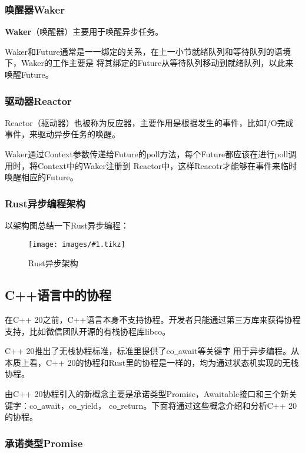 \documentclass[supercite]{HustGraduPaper}
\newcommand{\cfig}[3]{
  \begin{figure}[htb]
    \centering
    \texttt{[image: images/\#1.tikz]}
    \caption{#3}
    \label{fig:#1}
  \end{figure}
}
\theoremstyle{definition}
\begin{document}
\subsubsection{唤醒器Waker}
\textbf{Waker}（唤醒器）主要用于唤醒异步任务。\par

Waker和Future通常是一一绑定的关系，在上一小节就绪队列和等待队列的语境下，Waker的工作主要是
将其绑定的Future从等待队列移动到就绪队列，以此来唤醒Future。\par

\subsubsection{驱动器Reactor}
Reactor（驱动器）也被称为反应器，主要作用是根据发生的事件，比如I/O完成事件，来驱动异步任务的唤醒。\par

Waker通过Context参数传递给Future的poll方法，每个Future都应该在进行poll调用时，将Context中的Waker注册到
Reactor中，这样Reacotr才能够在事件来临时唤醒相应的Future。\par

\subsubsection{Rust异步编程架构}
以架构图总结一下Rust异步编程：

\cfig{rust-async}{0.9}{Rust异步架构}

\subsection{C++语言中的协程}
在C++ 20之前，C++语言本身不支持协程。开发者只能通过第三方库来获得协程支持，比如微信团队开源的有栈协程库libco。\par

C++ 20推出了无栈协程标准，标准里提供了co\underline{~}await等关键字
用于异步编程。从本质上看，C++ 20的协程和Rust里的协程是一样的，均为通过状态机实现的无栈协程。\par

由C++ 20协程引入的新概念主要是承诺类型Promise，Awaitable接口和三个新关键字：co\underline{~}await，co\underline{~}yield，
co\underline{~}return。下面将通过这些概念介绍和分析C++ 20的协程。\par

\subsubsection{承诺类型Promise}
\end{document}
